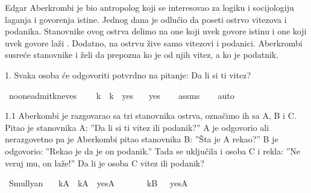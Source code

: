 \begin{isabellebody}
%
\begin{exercise}[subtitle=Raymond M. Smullyan: Logical Labyrinths]
%
\begin{isamarkuptext}%
Edgar Aberkrombi je bio antropolog koji se interesovao za logiku i socijologiju
      laganja i govorenja istine. Jednog dana je odlučio da poseti ostrvo vitezova i podanika.
      Stanovnike ovog ostrva delimo na one koji uvek govore istinu  i
      one koji uvek govore laži . Dodatno, na ostrvu žive samo vitezovi i 
      podanici. Aberkrombi susreće stanovnike i želi da prepozna ko je od njih vitez, 
      a ko je podatnik.%
\end{isamarkuptext}\isamarkuptrue%
%
\begin{isamarkuptext}%
1. Svaka osoba će odgovoriti potvrdno na pitanje: Da li si ti vitez?%
\end{isamarkuptext}\isamarkuptrue%
\isamarkupfalse%
\ no{\isacharunderscore}{\kern0pt}one{\isacharunderscore}{\kern0pt}admit{\isacharunderscore}{\kern0pt}kneves{\isacharcolon}{\kern0pt}\ \isanewline
\ \ \ {\isachardoublequoteopen}k\ {\isasymlongleftrightarrow}\ {\isacharparenleft}{\kern0pt}k\ {\isasymlongleftrightarrow}\ yes{\isacharparenright}{\kern0pt}{\isachardoublequoteclose}\isanewline
\ \ \ {\isachardoublequoteopen}yes{\isachardoublequoteclose}\isanewline
%
\isadelimproof
\ \ %
\endisadelimproof
%
\isatagproof
{}\isamarkupfalse%
\ assms\isanewline
\ \ \isamarkupfalse%
\ auto%
\endisatagproof
{\isafoldproof}%
%
\isadelimproof
%
\endisadelimproof
%
\begin{isamarkuptext}%
1.1 Aberkombi je razgovarao sa tri stanovnika ostrva, označimo ih sa A, B i C. 
          Pitao je stanovnika A: ”Da li si ti vitez ili podanik?” 
          A je odgovorio ali nerazgovetno 
          pa je Aberkombi pitao stanovnika B: ”Šta je A rekao?” 
          B je odgovorio: ”Rekao je da je on podanik.” 
          Tada se uključila i osoba C i rekla: ”Ne veruj mu, on laže!” 
          Da li je osoba C vitez ili podanik?%
\end{isamarkuptext}\isamarkuptrue%
\isamarkupfalse%
\ Smullyan{\isacharunderscore}{\kern0pt}{}{\isacharunderscore}{\kern0pt}{}{\isacharcolon}{\kern0pt}\isanewline
\ \ \ {\isachardoublequoteopen}kA\ {\isasymlongleftrightarrow}\ {\isacharparenleft}{\kern0pt}kA\ {\isasymlongleftrightarrow}\ yesA{\isacharparenright}{\kern0pt}{\isachardoublequoteclose}\isanewline
\ \ \ \ \ \ \ {\isachardoublequoteopen}kB\ {\isasymlongleftrightarrow}\ {\isasymnot}\ yesA{\isachardoublequoteclose}\isanewline

\end{exercise}
\end{isabellebody}
